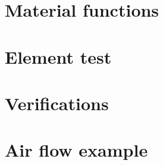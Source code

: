 
\newpage
\section{Material functions}
\label{bmt:G-material_functions}

\section{Element test}
\label{bmt:G-element_test}

\section{Verifications}
\label{bmt:G-Verifications}

\section{Air flow example}
\label{bmt:G-air_flow_examples}


